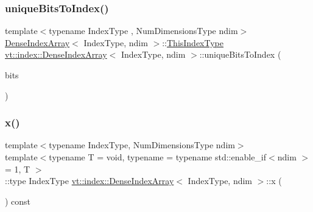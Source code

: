 \mbox{\label{structvt_1_1index_1_1_dense_index_array_ad9f18d4b0c0b5082c533286288c42529}} 
\subsubsection{\texorpdfstring{unique\+Bits\+To\+Index()}{uniqueBitsToIndex()}}
{\footnotesize\ttfamily template$<$typename Index\+Type , Num\+Dimensions\+Type ndim$>$ \\
\hyperlink{structvt_1_1index_1_1_dense_index_array}{Dense\+Index\+Array}$<$ Index\+Type, ndim $>$\+::\hyperlink{structvt_1_1index_1_1_dense_index_array_a6915511f6a82dff2522d6e8c2be20f2a}{This\+Index\+Type} \hyperlink{structvt_1_1index_1_1_dense_index_array}{vt\+::index\+::\+Dense\+Index\+Array}$<$ Index\+Type, ndim $>$\+::unique\+Bits\+To\+Index (\begin{DoxyParamCaption}\item[{\hyperlink{namespacevt_a913e1f07b5228dd8bb64040dc6dcea14}{Unique\+Index\+Bit\+Type} const \&}]{bits }\end{DoxyParamCaption})\hspace{0.3cm}{\ttfamily [static]}}

\mbox{\label{structvt_1_1index_1_1_dense_index_array_a0604b24914af854d09d4da97eae4ef74}} 
\subsubsection{\texorpdfstring{x()}{x()}\hspace{0.1cm}{\footnotesize\ttfamily [1/2]}}
{\footnotesize\ttfamily template$<$typename Index\+Type, Num\+Dimensions\+Type ndim$>$ \\
template$<$typename T  = void, typename  = typename std\+::enable\+\_\+if$<$ndim $>$= 1, T $>$ \\
\+::type Index\+Type \hyperlink{structvt_1_1index_1_1_dense_index_array}{vt\+::index\+::\+Dense\+Index\+Array}$<$ Index\+Type, ndim $>$\+::x (\begin{DoxyParamCaption}{ }\end{DoxyParamCaption}) const}

